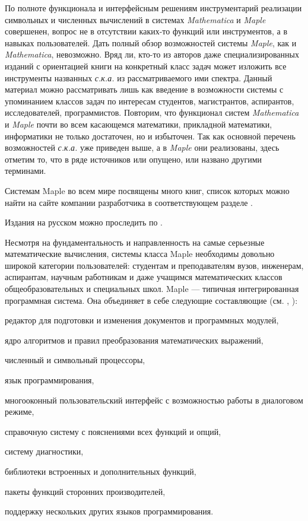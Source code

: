 По полноте функционала и интерфейсным решениям инструментарий реализации символьных и численных вычислений в системах \textit{Mathematica} и \textit{Maple} совершенен, вопрос не в отсутствии каких-то функций или инструментов, а в навыках пользователей.
Дать полный обзор возможностей системы \textit{Maple}, как и \textit{Mathematica}, невозможно. Вряд ли, кто-то из авторов даже специализированных изданий с ориентацией книги на конкретный класс задач может изложить все инструменты названных \textit{с.к.а.} из рассматриваемого ими спектра. Данный материал можно рассматривать лишь как введение в возможности системы с упоминанием классов задач по интересам студентов, магистрантов, аспирантов, исследователей, программистов. Повторим, что функционал систем \textit{Mathematica} и \textit{Maple} почти во всем касающемся математики, прикладной математики, информатики не только достаточен, но и избыточен. Так как основной перечень возможностей \textit{с.к.а.} уже приведен выше, а в \textit{Maple} они реализованы, здесь отметим то, что в ряде источников или опущено, или названо другими терминами.

Системам Maple во всем мире посвящены много книг, список которых можно найти на сайте компании разработчика в соответствующем разделе .

Издания на русском можно проследить по . 

Несмотря на фундаментальность и направленность на самые серьезные математические вычисления, системы класса Maple необходимы довольно широкой категории пользователей: студентам и преподавателям вузов, инженерам, аспирантам, научным работникам и даже учащимся математических классов общеобразовательных и специальных школ.
Maple --- типичная интегрированная программная система. Она объединяет в себе следующие составляющие (см. , ):
\begin{textitemize}
	\item редактор для подготовки и изменения документов и программных модулей, 
	\item ядро алгоритмов и правил преобразования математических выражений, 
	\item численный и символьный процессоры, 
	\item язык программирования, 
	\item многооконный пользовательский интерфейс с возможностью работы в диалоговом режиме, 
	\item справочную систему с пояснениями всех функций и опций, 
	\item систему диагностики, 
	\item библиотеки встроенных и дополнительных функций, 
	\item пакеты функций сторонних производителей, 
	\item поддержку нескольких других языков программирования.
\end{textitemize}

